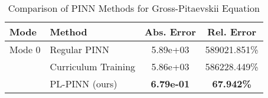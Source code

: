 \begin{table}[htbp]
\centering
\caption{Comparison of PINN Methods for Gross-Pitaevskii Equation}
\label{tab:pinn_comparison}
\begin{tabular}{llcc}
\toprule
Mode & Method & Abs. Error & Rel. Error \\
\midrule
Mode 0 & Regular PINN & 5.89e+03 & 589021.851\% \\
 & Curriculum Training & 5.86e+03 & 586228.449\% \\
 & PL-PINN (ours) & \textbf{6.79e-01} & \textbf{67.942\%} \\
\bottomrule
\end{tabular}
\end{table}